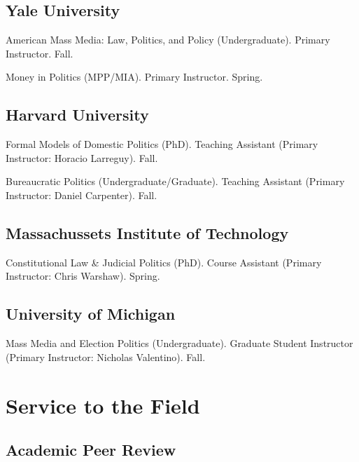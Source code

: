 \documentclass[12pt,letterpaper]{report}
\newcommand{\course}[5]{\item[#1] \tab{}#3 (#4). #5. #2.} %
\begin{document}
    \subsection*{Yale University}
    \begin{tablist}
    \course{2019}{Fall}{American Mass Media: Law, Politics, and Policy}{Undergraduate}{Primary Instructor}
    \course{2019}{Spring}{Money in Politics}{MPP/MIA}{Primary Instructor}
    \end{tablist}
    
    
    \subsection*{Harvard University}
    \begin{tablist}
    \course{2017}{Fall}{Formal Models of Domestic Politics}{PhD}{Teaching Assistant (Primary Instructor: Horacio Larreguy)}
    \course{2016}{Fall}{Bureaucratic Politics}{Undergraduate/Graduate}{Teaching Assistant (Primary Instructor: Daniel Carpenter)}
    \end{tablist}

    \subsection*{Massachussets Institute of Technology}
    \begin{tablist}
    \course{2015}{Spring}{Constitutional Law \& Judicial Politics}{PhD}{Course Assistant (Primary Instructor: Chris Warshaw)}
    \end{tablist}

   \subsection*{University of Michigan}

   \begin{tablist}
    \course{2013}{Fall}{Mass Media and Election Politics}{Undergraduate}{Graduate Student Instructor (Primary Instructor: Nicholas Valentino)}
    \end{tablist}
    
    
    \section*{Service to the Field}
    \subsection*{Academic Peer Review}
    
\end{document}

